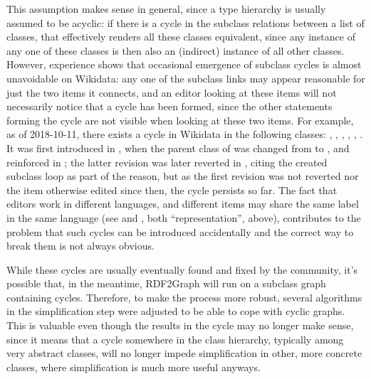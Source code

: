 This assumption makes sense in general,
since a type hierarchy is usually assumed to be acyclic:
if there is a cycle in the subclass relations between a list of classes,
that effectively renders all these classes equivalent,
since any instance of any one of these classes is then also an (indirect) instance of all other classes.
However, experience shows %
that occasional emergence of subclass cycles is almost unavoidable on \gls{Wikidata}:
any one of the subclass links may appear reasonable for just the two \glspl{item} it connects,
and an editor looking at these \glspl{item} will not necessarily notice that a cycle has been formed,
since the other statements forming the cycle are not visible when looking at these two \glspl{item}.
For example, as of 2018-10-11, %
there exists a cycle in \gls{Wikidata} in the following classes:
, , ,
, , .
It was first introduced in ,
when the parent class of 
was changed from  to ,
and reinforced in ;
the latter revision was later reverted in ,
citing the created subclass loop as part of the reason,
but as the first revision was not reverted nor the \gls{item} otherwise edited since then,
the cycle persists so far.
The fact that editors work in different languages,
and different items may share the same label in the same language
(see  and , both “representation”, above),
contributes to the problem that such cycles can be introduced accidentally
and the correct way to break them is not always obvious.

While these cycles are usually eventually found and fixed by the community, %
it’s possible that, in the meantime, \gls{RDF2Graph} will run on a subclass graph containing cycles.
Therefore, to make the process more robust,
several algorithms in the simplification step were adjusted to be able to cope with cyclic graphs.
This is valuable even though the results in the cycle may no longer make sense,
since it means that a cycle somewhere in the class hierarchy,
typically among very abstract classes,
will no longer impede simplification in other, more concrete classes,
where simplification is much more useful anyways.

